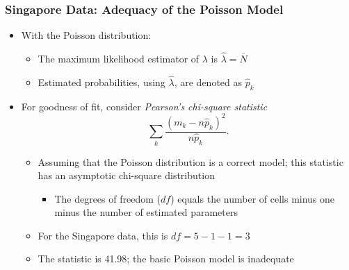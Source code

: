 \documentclass{beamer}
\begin{document}
\begin{frame}[shrink=2]
  \frametitle{Singapore Data: Adequacy of the Poisson Model}
\begin{itemize}
\item With the Poisson distribution: \vspace{2mm}
\begin{itemize}

\item The maximum likelihood estimator of $\lambda$ is
$\widehat{\lambda}=\overline{N}$ \vspace{2mm}
\item Estimated probabilities, using $\widehat{\lambda}$, are denoted as
$\widehat{p}_k$ \vspace{2mm}
\end{itemize}
\pause
\item For goodness of fit, consider \emph{Pearson's chi-square statistic}
\begin{equation*}
\sum_k\frac{\left( m_k-n\widehat{p}_k \right) ^{2}}{n\widehat{p}_k}.
\end{equation*}

\begin{itemize}
\item Assuming that the Poisson distribution is a correct model; this statistic has an asymptotic chi-square
distribution \vspace{2mm}
\begin{itemize}\item The degrees of freedom ($df$) equals the number of cells minus one minus the number of estimated parameters \vspace{2mm}\end{itemize}
\item For the Singapore data, this is $df=5-1-1=3$ \vspace{2mm}
\item The statistic is 41.98; the basic Poisson model is inadequate
\end{itemize}
\end{itemize}
\end{frame}
\end{document}
